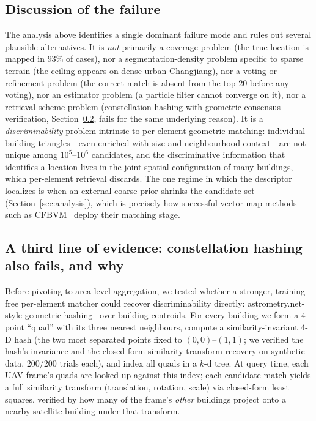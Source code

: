 \documentclass[10pt]{article}
\theoremstyle{plain}
\theoremstyle{definition}
\begin{document}
\subsection{Discussion of the failure}

The analysis above identifies a single dominant failure mode and rules out
several plausible alternatives. It is \emph{not} primarily a coverage problem
(the true location is mapped in $93\%$ of cases), nor a segmentation-density
problem specific to sparse terrain (the ceiling appears on dense-urban
Changjiang), nor a voting or refinement problem (the correct match is absent
from the top-$20$ before any voting), nor an estimator problem (a particle
filter cannot converge on it), nor a retrieval-scheme problem (constellation
hashing with geometric consensus verification, Section~\ref{sec:quadhash},
fails for the same underlying reason). It is a \emph{discriminability} problem intrinsic
to per-element geometric matching: individual building triangles---even enriched
with size and neighbourhood context---are not unique among $10^{5}$--$10^{6}$
candidates, and the discriminative information that identifies a location lives
in the joint spatial configuration of many buildings, which per-element
retrieval discards. The one regime in which the descriptor localizes is when an
external coarse prior shrinks the candidate set (Section~\ref{sec:analysis}),
which is precisely how successful vector-map methods such as
CFBVM~\cite{ouyang2024cfbvm} deploy their matching stage.

\subsection{A third line of evidence: constellation hashing also fails, and why}
\label{sec:quadhash}

Before pivoting to area-level aggregation, we tested whether a stronger,
training-free per-element matcher could recover discriminability directly:
astrometry.net-style geometric hashing~\cite{lang2010astrometry} over building
centroids. For every building we form a 4-point ``quad'' with its three
nearest neighbours, compute a similarity-invariant 4-D hash (the two most
separated points fixed to $(0,0)$--$(1,1)$; we verified the hash's invariance
and the closed-form similarity-transform recovery on synthetic data, $200/200$
trials each), and index all quads in a $k$-d tree. At query time, each UAV
frame's quads are looked up against this index; each candidate match yields a
full similarity transform (translation, rotation, scale) via closed-form
least squares, verified by how many of the frame's \emph{other} buildings
project onto a nearby satellite building under that transform.
\end{document}
